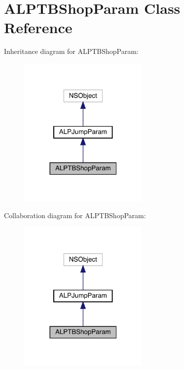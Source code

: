 \hypertarget{interface_a_l_p_t_b_shop_param}{}\section{A\+L\+P\+T\+B\+Shop\+Param Class Reference}
\label{interface_a_l_p_t_b_shop_param}


Inheritance diagram for A\+L\+P\+T\+B\+Shop\+Param\+:\nopagebreak
\begin{figure}[H]
\begin{center}
\leavevmode
\includegraphics[width=180pt]{interface_a_l_p_t_b_shop_param__inherit__graph}
\end{center}
\end{figure}


Collaboration diagram for A\+L\+P\+T\+B\+Shop\+Param\+:\nopagebreak
\begin{figure}[H]
\begin{center}
\leavevmode
\includegraphics[width=180pt]{interface_a_l_p_t_b_shop_param__coll__graph}
\end{center}
\end{figure}
